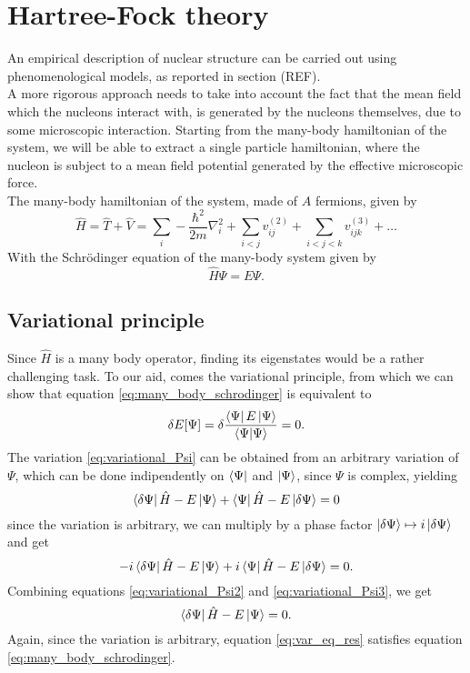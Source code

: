 \section{Hartree-Fock theory}
An empirical description of nuclear structure can be carried out using phenomenological models, as reported in section (REF).
\\A more rigorous approach needs to take into account the fact that the mean field which the nucleons interact with, is generated by the nucleons themselves, due to some microscopic interaction.
Starting from the many-body hamiltonian of the system, we will be able to extract a single particle hamiltonian, where the nucleon is subject to a mean field potential generated by the effective microscopic force.
\\The many-body hamiltonian of the system, made of $A$ fermions, given by
\begin{equation}
    \label{eq:mb_hamiltonian}
    \hat H = \hat T + \hat V = \sum_i -\frac{\hbar^2}{2m}\nabla^2_i + \sum_{i<j} v^{(2)}_{ij} + \sum_{i<j<k} v^{(3)}_{ijk }+\ldots
\end{equation}
With the Schr\"odinger equation of the many-body system given by
\begin{equation}
    \label{eq:many_body_schrodinger}
    \hat H \Psi = E\Psi.
\end{equation}
\subsection{Variational principle}
Since $\hat H$ is a many body operator, finding its eigenstates would be a rather challenging task. To our aid, comes the variational principle, from which we can show that equation \ref{eq:many_body_schrodinger} is equivalent to 
\begin{equation}
    \label{eq:variational_Psi}
    \delta E[\Psi] = \delta \frac{\bra{\Psi} E \ket{\Psi}}{\bra{\Psi}\ket{\Psi}} = 0.
\end{equation}
The variation \ref{eq:variational_Psi} can be obtained from an arbitrary variation of $\Psi$, which can be done indipendently on $\bra{\Psi}$ and $\ket{\Psi}$, since $\Psi$ is complex, yielding
\begin{equation}
    \label{eq:variational_Psi2}
    \bra{\delta \Psi} \hat H  -E\ket{\Psi} + \bra{\Psi} \hat H-E \ket{\delta \Psi} = 0
\end{equation}
since the variation is arbitrary, we can multiply by a phase factor $\ket{\delta \Psi}\mapsto i\ket{\delta \Psi}$ and get
\begin{equation}
    \label{eq:variational_Psi3}
    -i\bra{\delta \Psi} \hat H-E \ket{\Psi} + i\bra{\Psi} \hat H-E \ket{\delta \Psi} = 0.
\end{equation}
Combining equations \ref{eq:variational_Psi2} and \ref{eq:variational_Psi3}, we get
\begin{equation}
    \label{eq:var_eq_res}
    \bra{\delta \Psi} \hat H-E \ket{\Psi} = 0.
\end{equation}
Again, since the variation is arbitrary, equation \ref{eq:var_eq_res} satisfies equation \ref{eq:many_body_schrodinger}.
